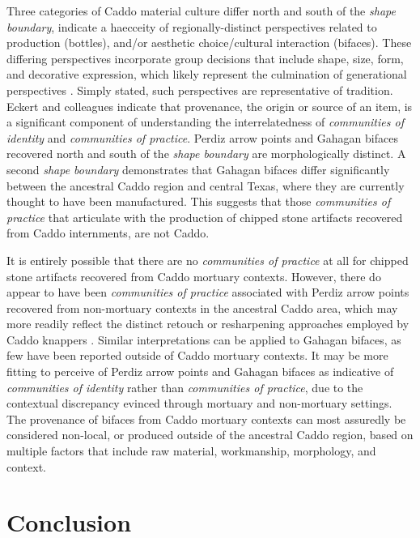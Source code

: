 \documentclass[smallextended]{svjour3}       %
\begin{document}
Three categories of Caddo material culture differ north and south of the
\emph{shape boundary}, indicate a haecceity of regionally-distinct
perspectives related to production (bottles), and/or aesthetic
choice/cultural interaction (bifaces). These differing perspectives
incorporate group decisions that include shape, size, form, and
decorative expression, which likely represent the culmination of
generational perspectives \cite{RN5610}. Simply stated, such
perspectives are representative of tradition. Eckert and colleagues
\cite{RN8061} indicate that provenance, the origin or source of an item,
is a significant component of understanding the interrelatedness of
\emph{communities of identity} and \emph{communities of practice}.
Perdiz arrow points and Gahagan bifaces recovered north and south of the
\emph{shape boundary} are morphologically distinct. A second \emph{shape
boundary} demonstrates that Gahagan bifaces differ significantly between
the ancestral Caddo region and central Texas, where they are currently
thought to have been manufactured. This suggests that those
\emph{communities of practice} that articulate with the production of
chipped stone artifacts recovered from Caddo internments, are not Caddo.

It is entirely possible that there are no \emph{communities of practice}
at all for chipped stone artifacts recovered from Caddo mortuary
contexts. However, there do appear to have been \emph{communities of
practice} associated with Perdiz arrow points recovered from
non-mortuary contexts in the ancestral Caddo area, which may more
readily reflect the distinct retouch or resharpening approaches employed
by Caddo knappers \cite{RN9364}. Similar interpretations can be applied
to Gahagan bifaces, as few have been reported outside of Caddo mortuary
contexts. It may be more fitting to perceive of Perdiz arrow points and
Gahagan bifaces as indicative of \emph{communities of identity} rather
than \emph{communities of practice}, due to the contextual discrepancy
evinced through mortuary and non-mortuary settings. The provenance of
bifaces from Caddo mortuary contexts can most assuredly be considered
non-local, or produced outside of the ancestral Caddo region, based on
multiple factors that include raw material, workmanship, morphology, and
context.

\hypertarget{conclusion}{%
\section{Conclusion}\label{conclusion}}
\end{document}
